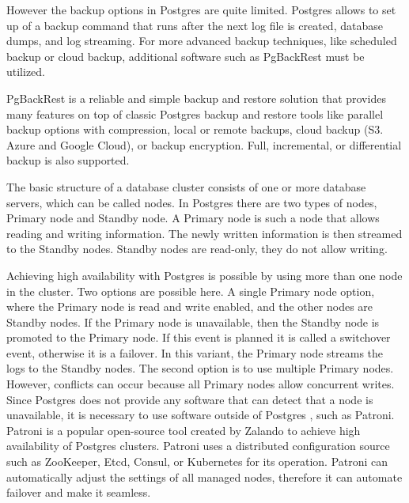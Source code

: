 However the backup options in Postgres are quite limited. Postgres allows to set up of a backup command that runs after the next log file is created, database dumps, and log streaming. For more advanced backup techniques, like scheduled backup or cloud backup, additional software such as PgBackRest must be utilized. \cite{DocuPgPITR}

PgBackRest is a reliable and simple backup and restore solution that provides many features on top of classic Postgres backup and restore tools like parallel backup options with compression, local or remote backups, cloud backup (S3. Azure and Google Cloud), or backup encryption. Full, incremental, or differential backup is also supported. \cite{PGbackRest}

The basic structure of a database cluster consists of one or more database servers, which can be called nodes. In Postgres there are two types of nodes, Primary node and Standby node.  A Primary node is such a node that allows reading and writing information. The newly written information is then streamed to the Standby nodes. Standby nodes are read-only, they do not allow writing. \cite{pg14replication}

Achieving high availability with Postgres is possible by using more than one node in the cluster. Two options are possible here. A single Primary node option, where the Primary node is read and write enabled, and the other nodes are Standby nodes. If the Primary node is unavailable, then the Standby node is promoted to the Primary node. If this event is planned it is called a switchover event, otherwise it is a failover. In this variant, the Primary node streams the logs to the Standby nodes. The second option is to use multiple Primary nodes. However, conflicts can occur because all Primary nodes allow concurrent writes. \cite{docuPgHA}
Since Postgres does not provide any software that can detect that a node is unavailable, it is necessary to use software outside of Postgres \cite{docuPgFailover}, such as Patroni.
Patroni is a popular open-source tool created by Zalando to achieve high availability of Postgres clusters. Patroni uses a distributed configuration source such as ZooKeeper, Etcd, Consul, or Kubernetes for its operation. Patroni can automatically adjust the settings of all managed nodes, therefore it can automate failover and make it seamless. \cite{PalarkMigratingPg} \cite{PatroniDocu}



